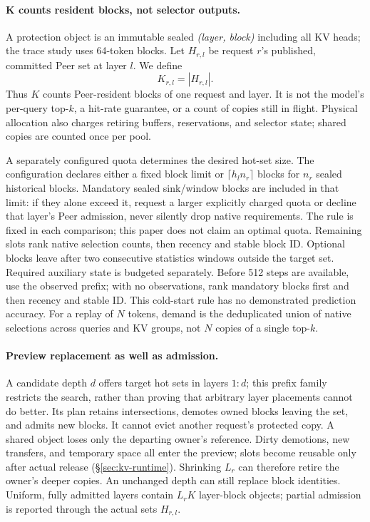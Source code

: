 \paragraph{K counts resident blocks, not selector outputs.}
A protection object is an immutable sealed \emph{(layer, block)} including
all KV heads; the trace study uses 64-token blocks. Let $H_{r,l}$ be
request $r$'s published, committed Peer set at layer $l$. We define
\begin{equation}
 K_{r,l}=|H_{r,l}|.
 \label{eq:hot-block-count}
\end{equation}
Thus $K$ counts Peer-resident blocks of one request and layer. It is not
the model's per-query top-$k$, a hit-rate guarantee, or a count of copies
still in flight. Physical allocation also charges retiring buffers,
reservations, and selector state; shared copies are counted once per pool.

A separately configured quota determines the desired hot-set size.
The configuration declares either a fixed block limit or
$\lceil h_l n_r\rceil$ blocks for $n_r$ sealed historical blocks.
Mandatory sealed sink/window blocks are included in that limit: if they
alone exceed it, request a larger explicitly charged quota or decline
that layer's Peer admission, never silently drop native requirements.
The rule is
fixed in each comparison; this paper does not claim an optimal quota.
Remaining slots rank native selection counts, then recency and stable
block ID. Optional blocks leave after two consecutive statistics windows
outside the target set. Required auxiliary state is budgeted separately.
Before 512 steps are available, use the observed prefix; with no observations,
rank mandatory blocks first and then recency and stable ID. This cold-start
rule has no demonstrated prediction accuracy.
For a replay of $N$ tokens, demand is the deduplicated union of native
selections across queries and KV groups, not $N$ copies of a single top-$k$.

\paragraph{Preview replacement as well as admission.}
A candidate depth $d$ offers target hot sets in layers $1{:}d$;
this prefix family restricts the search, rather than proving that arbitrary
layer placements cannot do better.
Its plan retains intersections, demotes owned blocks leaving the set,
and admits new blocks. It cannot evict another request's protected copy.
A shared object loses only the departing owner's reference.
Dirty demotions, new transfers, and temporary space all enter the preview;
slots become reusable only after actual release
(\S\ref{sec:kv-runtime}). Shrinking $L_r$ can therefore retire the owner's
deeper copies. An unchanged depth can still replace block identities.
Uniform, fully admitted layers contain $L_r K$ layer-block objects;
partial admission is reported through the actual sets $H_{r,l}$.

